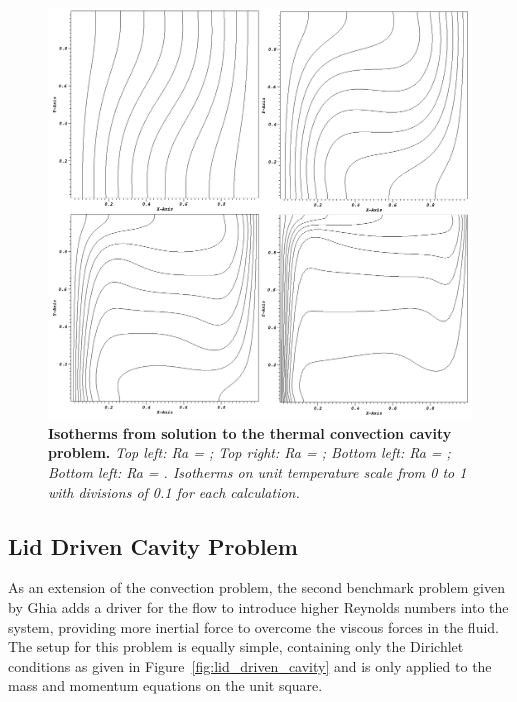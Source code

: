 \begin{figure}[t!]
  \begin{center}
    \includegraphics[width=6in]{chapters/nonlinear_problem/convection_isotherms.png}
  \end{center}
  \caption{\textbf{Isotherms from solution to the thermal convection
        cavity problem.} \textit{Top left: Ra = ; Top right:
        Ra = ; Bottom left: Ra = ; Bottom left: Ra =
        . Isotherms on unit temperature scale from 0 to 1
        with divisions of 0.1 for each calculation.}}
  \label{fig:convection_isotherms}
\end{figure}

\clearpage

\subsection{Lid Driven Cavity Problem}
\label{subsec:lid_driven_cavity}
As an extension of the convection problem, the second benchmark
problem given by Ghia \citep{ghia_high-re_1982} adds a driver for the
flow to introduce higher Reynolds numbers into the system, providing
more inertial force to overcome the viscous forces in the fluid. The
setup for this problem is equally simple, containing only the
Dirichlet conditions as given in Figure~\ref{fig:lid_driven_cavity}
and is only applied to the mass and momentum equations on the unit
square.

